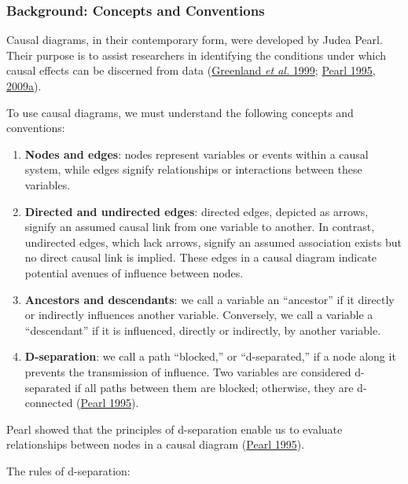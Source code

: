\documentclass[
  singlecolumn]{article}
\begin{document}
\hypertarget{background-concepts-and-conventions}{%
\subsubsection{Background: Concepts and
Conventions}\label{background-concepts-and-conventions}}

Causal diagrams, in their contemporary form, were developed by Judea
Pearl. Their purpose is to assist researchers in identifying the
conditions under which causal effects can be discerned from data
(\protect\hyperlink{ref-greenland1999}{Greenland \emph{et al.} 1999};
\protect\hyperlink{ref-pearl1995}{Pearl 1995},
\protect\hyperlink{ref-pearl2009}{2009a}).

To use causal diagrams, we must understand the following concepts and
conventions:

\begin{enumerate}
\def\labelenumi{\arabic{enumi}.}
\item
  \textbf{Nodes and edges}: nodes represent variables or events within a
  causal system, while edges signify relationships or interactions
  between these variables.
\item
  \textbf{Directed and undirected edges}: directed edges, depicted as
  arrows, signify an assumed causal link from one variable to another.
  In contrast, undirected edges, which lack arrows, signify an assumed
  association exists but no direct causal link is implied. These edges
  in a causal diagram indicate potential avenues of influence between
  nodes.
\item
  \textbf{Ancestors and descendants}: we call a variable an ``ancestor''
  if it directly or indirectly influences another variable. Conversely,
  we call a variable a ``descendant'' if it is influenced, directly or
  indirectly, by another variable.
\item
  \textbf{D-separation}: we call a path ``blocked,'' or ``d-separated,''
  if a node along it prevents the transmission of influence. Two
  variables are considered d-separated if all paths between them are
  blocked; otherwise, they are d-connected
  (\protect\hyperlink{ref-pearl1995}{Pearl 1995}).
\end{enumerate}

Pearl showed that the principles of d-separation enable us to evaluate
relationships between nodes in a causal diagram
(\protect\hyperlink{ref-pearl1995}{Pearl 1995}).

The rules of d-separation:
\end{document}
